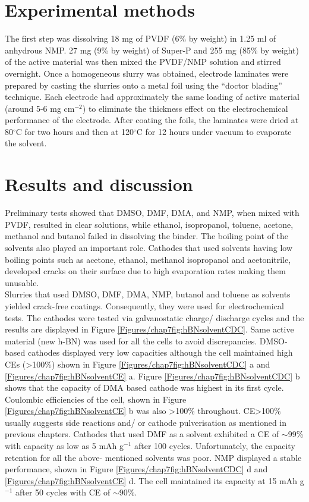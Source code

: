 \section{Experimental methods}

The first step was dissolving 18 mg of PVDF (6\% by weight) in 1.25 ml of anhydrous NMP. 27 mg (9\% by weight) of Super-P and 255 mg (85\% by weight) of the active material was then mixed the PVDF/NMP solution and stirred overnight. Once a homogeneous slurry was obtained, electrode laminates were prepared by casting the slurries onto a metal foil using the \enquote{doctor blading} technique. Each electrode had approximately the same loading of active material (around 5-6 mg cm$^{-2}$) to eliminate the thickness effect on the electrochemical performance of the electrode. After coating the foils, the laminates were dried at 80$^{\circ}$C for two hours and then at 120$^{\circ}$C for 12 hours under vacuum to evaporate the solvent. 
\section{Results and discussion}
Preliminary tests showed that DMSO, DMF, DMA, and NMP, when mixed with PVDF, resulted in clear solutions, while ethanol, isopropanol, toluene, acetone, methanol and butanol failed in dissolving the binder. The boiling point of the solvents also played an important role. Cathodes that used solvents having low boiling points such as acetone, ethanol, methanol isopropanol and acetonitrile, developed cracks on their surface due to high evaporation rates making them unusable. \\
Slurries that used DMSO, DMF, DMA, NMP, butanol and toluene as solvents yielded crack-free coatings. Consequently, they were used for electrochemical tests. The cathodes were tested via galvanostatic charge/ discharge cycles and the results are displayed in Figure \ref{Figures/chap7fig:hBNsolventCDC}. Same active material (new h-BN) was used for all the cells to avoid discrepancies. DMSO-based cathodes displayed very low capacities although the cell maintained high CEs (>100\%) shown in Figure \ref{Figures/chap7fig:hBNsolventCDC} a and \ref{Figures/chap7fig:hBNsolventCE} a.  Figure \ref{Figures/chap7fig:hBNsolventCDC} b shows that the capacity of DMA based cathode was highest in its first cycle. Coulombic efficiencies of the cell, shown in Figure \ref{Figures/chap7fig:hBNsolventCE} b was also >100\% throughout. CE>100\% usually suggests side reactions and/ or cathode pulverisation as mentioned in previous chapters. Cathodes that used DMF as a solvent exhibited a CE of $\sim$99\% with capacity as low as 5 mAh g$^{-1}$ after 100 cycles. Unfortunately, the capacity retention for all the above- mentioned solvents was poor. NMP displayed a stable performance, shown in Figure \ref{Figures/chap7fig:hBNsolventCDC} d and \ref{Figures/chap7fig:hBNsolventCE} d. The cell maintained its capacity at 15 mAh g$^{-1}$ after 50 cycles with CE of $\sim$90\%. 

